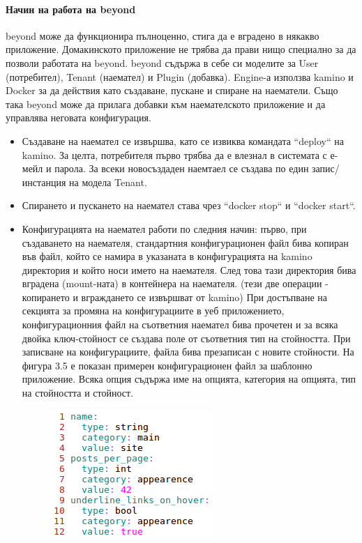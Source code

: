 \documentclass[pdftex,14pt,a4paper]{extreport}
\begin{document}
\paragraph {Начин на работа на beyond}
beyond може да функционира пълноценно, стига да е вградено в някакво приложение. Домакинското приложение не трябва да прави нищо специално за да позволи работата на beyond. beyond съдържа в себе си моделите за User (потребител), Tenant (наемател) и Plugin (добавка). Engine-а използва kamino и Docker за да действия като създаване, пускане и спиране на наематели. Също така beyond може да прилага добавки към наемателското приложение и да управлява неговата конфигурация.
\begin{itemize}
  \item Създаване на наемател се извършва, като се извиква командата ``deploy`` на kamino. За целта, потребителя първо трябва да е влезнал в системата с е-мейл и парола. За всеки новосъздаден наемтаел се създава по един запис/инстанция на модела Tenant.
  \item Спирането и пускането на наемател става чрез ``docker stop`` и ``docker start``.
  \item Конфигурацията на наемател работи по следния начин: първо, при създаването на наемателя, стандартния конфигурационен файл бива копиран във файл, който се намира в указаната в конфигурацията на kamino директория и който носи името на наемателя. След това тази директория бива вградена (mount-ната) в контейнера на наемателя. (тези две операции - копирането и вграждането се извършват от kamino) При достъпване на секцията за промяна на конфигурациите в уеб приложението, конфигурационния файл на съответния наемател бива прочетен и за всяка двойка ключ-стойност се създава поле от съответния тип на стойността. При записване на конфигурациите, файла бива презаписан с новите стойности. На фигура 3.5 е показан примерен конфигурационен файл за шаблонно приложение. Всяка опция съдържа име на опцията, категория на опцията, тип на стойността и стойност.
  \begin{figure}[H]
    \centering
    \includegraphics[scale=0.8]{./snippets/tenant_config}

\end{figure}
\end{itemize}
\end{document}
